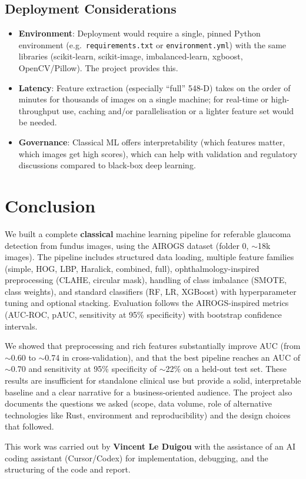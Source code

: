 \documentclass[11pt,a4paper]{article}
\begin{document}
\subsection{Deployment Considerations}

\begin{itemize}
  \item \textbf{Environment}: Deployment would require a single, pinned Python environment (e.g.\ \texttt{requirements.txt} or \texttt{environment.yml}) with the same libraries (scikit-learn, scikit-image, imbalanced-learn, xgboost, OpenCV/Pillow). The project provides this.
  \item \textbf{Latency}: Feature extraction (especially ``full'' 548-D) takes on the order of minutes for thousands of images on a single machine; for real-time or high-throughput use, caching and/or parallelisation or a lighter feature set would be needed.
  \item \textbf{Governance}: Classical ML offers interpretability (which features matter, which images get high scores), which can help with validation and regulatory discussions compared to black-box deep learning.
\end{itemize}

\section{Conclusion}

We built a complete \textbf{classical} machine learning pipeline for referable glaucoma detection from fundus images, using the AIROGS dataset (folder 0, $\sim$18k images). The pipeline includes structured data loading, multiple feature families (simple, HOG, LBP, Haralick, combined, full), ophthalmology-inspired preprocessing (CLAHE, circular mask), handling of class imbalance (SMOTE, class weights), and standard classifiers (RF, LR, XGBoost) with hyperparameter tuning and optional stacking. Evaluation follows the AIROGS-inspired metrics (AUC-ROC, pAUC, sensitivity at 95\% specificity) with bootstrap confidence intervals.

We showed that preprocessing and rich features substantially improve AUC (from $\sim$0.60 to $\sim$0.74 in cross-validation), and that the best pipeline reaches an AUC of $\sim$0.70 and sensitivity at 95\% specificity of $\sim$22\% on a held-out test set. These results are insufficient for standalone clinical use but provide a solid, interpretable baseline and a clear narrative for a business-oriented audience. The project also documents the questions we asked (scope, data volume, role of alternative technologies like Rust, environment and reproducibility) and the design choices that followed.

This work was carried out by \textbf{Vincent Le Duigou} with the assistance of an AI coding assistant (Cursor/Codex) for implementation, debugging, and the structuring of the code and report.
\end{document}
